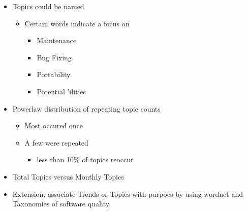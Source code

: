 \documentclass[titlepage,usenames,a4,landscape,semhelv,16pt]{seminar}
\begin{document}
\begin{slide}
\begin{itemize}
\begin{itemize}

\end{itemize}
\end{itemize}
\begin{itemize}
\item Topics could be named
	\begin{itemize}
	\item Certain words indicate a focus on
		\begin{itemize}
		\item Maintenance
		\item Bug Fixing
		\item Portability
		\item Potential 'ilities

	\end{itemize}
\end{itemize}
\end{itemize}
\begin{itemize}
\item Powerlaw distribution of repeating topic counts
	\begin{itemize}
	\item Most occured once
	\item A few were repeated 
		\begin{itemize}
		\item less than 10\% of topics reoccur

	\end{itemize}
\end{itemize}
\end{itemize}
\begin{itemize}
\item Total Topics versus Monthly Topics

\end{itemize}
\begin{itemize}
\item Extension, associate Trends or Topics with purpoes by using wordnet and Taxonomies of software quality 

\end{itemize}
\end{slide}
\end{document}

